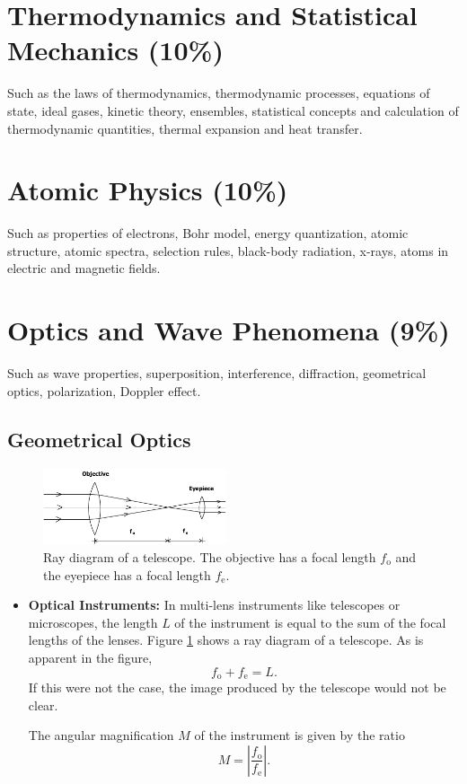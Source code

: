 \documentclass[%
 reprint,
superscriptaddress,
 amsmath,amssymb,
 aps,
prc,
]{revtex4-1}
\begin{document}
\section{Thermodynamics and Statistical Mechanics (10\%)}
Such as the laws of thermodynamics, thermodynamic processes, equations of state, ideal gases, kinetic theory, ensembles, statistical concepts and calculation of thermodynamic quantities, thermal expansion and heat transfer.

\section{Atomic Physics (10\%)}
Such as properties of electrons, Bohr model, energy quantization, atomic structure, atomic spectra, selection rules, black-body radiation, x-rays, atoms in electric and magnetic fields.

\section{Optics and Wave Phenomena (9\%)}
Such as wave properties, superposition, interference, diffraction, geometrical optics, polarization, Doppler effect.

\subsection{Geometrical Optics}

\begin{figure}[t]
	\centering
	\includegraphics[width=0.48\textwidth]{figures/telescope}
	\caption{Ray diagram of a telescope. The objective has a focal length $f_\text{o}$ and the eyepiece has a focal length $f_\text{e}$. }
	\label{fig:telescope}
\end{figure}

\begin{itemize}
	\item \textbf{Optical Instruments:} In multi-lens instruments like telescopes or microscopes, the length $L$ of the instrument is equal to the sum of the focal lengths of the lenses. Figure \ref{fig:telescope} shows a ray diagram of a telescope. As is apparent in the figure,
	\begin{equation}
		f_\text{o} + f_\text{e} = L.
	\end{equation}
	If this were not the case, the image produced by the telescope would not be clear.
	
	The angular magnification $M$ of the instrument is given by the ratio
	\begin{equation}
		M = \left|\frac{f_\text{o}}{f_\text{e}}\right|.
	\end{equation}
\end{itemize}
\end{document}
